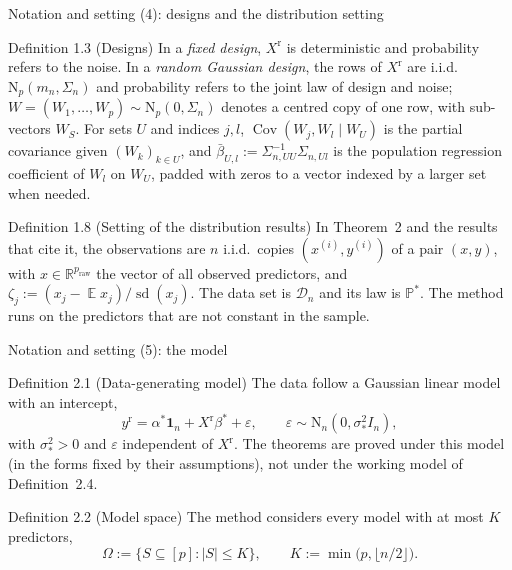 \documentclass[aspectratio=169]{beamer}
\newcommand{\R}{\mathbb{R}}
\newcommand{\one}{\mathbf{1}}
\newcommand{\set}[1]{[#1]}
\newcommand{\abs}[1]{\lvert #1\rvert}
\DeclareMathOperator{\E}{\mathbb{E}}
\renewcommand{\P}{\mathbb{P}}
\DeclareMathOperator{\Cov}{Cov}
\DeclareMathOperator{\sd}{sd}
\newcommand{\Normal}{\mathrm{N}}
\newcommand{\yr}{y^{\mathrm r}}
\newcommand{\Xr}{X^{\mathrm r}}
\newcommand{\praw}{p_{\mathrm{raw}}}
\newcommand{\sigs}{\sigma_*}
\newcommand{\bstar}{\beta^*}
\newcommand{\Sig}{\Sigma_n}
\newcommand{\Dn}{\mathcal D_n}
\newcommand{\Om}{\Omega}
\begin{document}
\begin{frame}{Notation and setting (4): designs and the distribution setting}
\footnotesize
\begin{block}{Definition 1.3 (Designs)}
In a \emph{fixed design}, $\Xr$ is deterministic and probability refers to the noise. In a \emph{random Gaussian design},
the rows of $\Xr$ are i.i.d.\ $\Normal_p(m_n,\Sig)$ and probability refers to the joint law of design and noise;
$W=(W_1,\dots,W_p)\sim\Normal_p(0,\Sig)$ denotes a centred copy of one row, with sub-vectors $W_S$. For sets $U$ and
indices $j,l$, $\Cov(W_j,W_l\mid W_U)$ is the partial covariance given $(W_k)_{k\in U}$, and
$\bar\beta_{U,l}:=\Sigma_{n,UU}^{-1}\Sigma_{n,Ul}$ is the population regression coefficient of $W_l$ on $W_U$, padded
with zeros to a vector indexed by a larger set when needed.
\end{block}
\begin{block}{Definition 1.8 (Setting of the distribution results)}
In Theorem~2 and the results that cite it, the observations are $n$ i.i.d.\ copies $(x^{(i)},y^{(i)})$ of a
pair $(x,y)$, with $x\in\R^{\praw}$ the vector of all observed predictors, and $\zeta_j:=(x_j-\E x_j)/\sd(x_j)$. The data
set is $\Dn$ and its law is $\P^*$. The method runs on the predictors that are not constant in the sample.
\end{block}
\end{frame}

\begin{frame}{Notation and setting (5): the model}
\footnotesize
\begin{block}{Definition 2.1 (Data-generating model)}
The data follow a Gaussian linear model with an intercept,
\begin{equation}\tag{2}
  \yr=\alpha^*\one_n+\Xr\bstar+\varepsilon,\qquad \varepsilon\sim\Normal_n(0,\sigs^2I_n),
\end{equation}
with $\sigs^2>0$ and $\varepsilon$ independent of $\Xr$. The theorems are proved under this model (in the forms fixed by
their assumptions), not under the working model of Definition~2.4.
\end{block}
\begin{block}{Definition 2.2 (Model space)}
The method considers every model with at most $K$ predictors,
\begin{equation}\tag{3}
  \Om:=\{S\subseteq\set{p}:\abs{S}\le K\},\qquad K:=\min\big(p,\lfloor n/2\rfloor\big).
\end{equation}
\end{block}
\end{frame}
\end{document}
